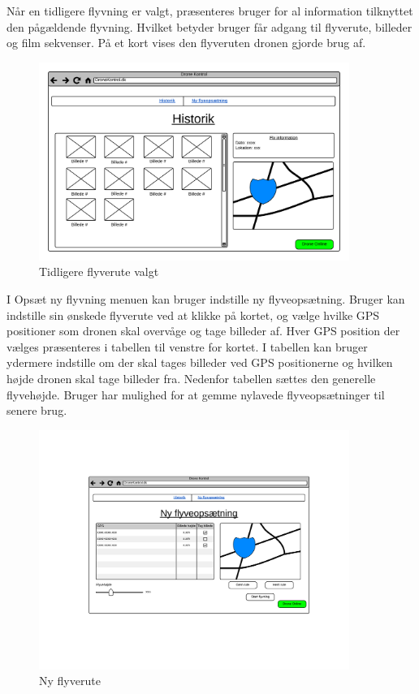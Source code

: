 \newpage

Når en tidligere flyvning er valgt, præsenteres bruger for al information tilknyttet den pågældende flyvning. Hvilket betyder bruger får adgang til flyverute, billeder og film sekvenser. På et kort vises den flyveruten dronen gjorde brug af.

\vspace{-5pt}
\begin{figure}[H]
	\centering
	\includegraphics[width=0.9\textwidth]{Billeder/UI_mockups/archive_choosen.png}
	\vspace{-5pt}
	\caption{Tidligere flyverute valgt}
	\label{fig:mockup_archive_choosen}
\end{figure}

\vspace{1cm}

I Opsæt ny flyvning menuen kan bruger indstille ny flyveopsætning. 
Bruger kan indstille sin ønskede flyverute ved at klikke på kortet, og vælge hvilke GPS positioner som dronen skal overvåge og tage billeder af. 
Hver GPS position der vælges præsenteres i tabellen til venstre for kortet. 
I tabellen kan bruger ydermere indstille om der skal tages billeder ved GPS positionerne og hvilken højde dronen skal tage billeder fra. Nedenfor tabellen sættes den generelle flyvehøjde.
Bruger har mulighed for at gemme nylavede flyveopsætninger til senere brug.

\vspace{-5pt}
\begin{figure}[H]
	\centering
	\includegraphics[width=0.9\textwidth]{Billeder/UI_mockups/setup_new_flight.png}
	\vspace{-5pt}
	\caption{Ny flyverute}
	\label{fig:mockup_setup_new_flight}
\end{figure}

 